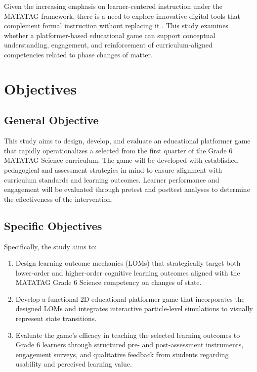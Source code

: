 Given the increasing emphasis on learner-centered instruction under the MATATAG framework, there is a need to explore innovative digital tools that complement formal instruction without replacing it \cite{Abragan2022}. This study examines whether a platformer-based educational game can support conceptual understanding, engagement, and reinforcement of curriculum-aligned competencies related to phase changes of matter.


\section{Objectives}

\subsection{General Objective}

This study aims to design, develop, and evaluate an educational platformer game that rapidly operationalizes a selected  from the first quarter of the Grade 6 MATATAG Science curriculum. The game will be developed with established pedagogical and assessment strategies in mind to ensure alignment with curriculum standards and learning outcomes. Learner performance and engagement will be evaluated through pretest and posttest analyses to determine the effectiveness of the intervention.

\subsection{Specific Objectives}

Specifically, the study aims to:

\begin{enumerate}
    \item Design learning outcome mechanics (LOMs) that strategically target both lower-order and higher-order cognitive learning outcomes aligned with the MATATAG Grade 6 Science competency on changes of state.
    \item Develop a functional 2D educational platformer game that incorporates the designed LOMs and integrates interactive particle-level simulations to visually represent state transitions.
    \item Evaluate the game's efficacy in teaching the selected learning outcomes to Grade 6 learners through structured pre- and post-assessment instruments, engagement surveys, and qualitative feedback from students regarding usability and perceived learning value.
\end{enumerate}


